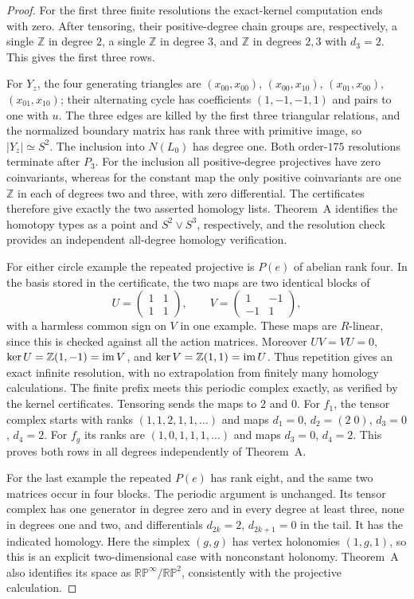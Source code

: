 \begin{proof}
For the first three finite resolutions the exact-kernel computation ends with
zero.  After tensoring, their positive-degree chain groups are,
respectively, a single $\mathbb Z$ in degree $2$, a single
$\mathbb Z$ in degree $3$, and $\mathbb Z$ in degrees $2,3$ with
$d_3=2$.  This gives the first three rows.

For $Y_z$, the four generating triangles are
$(x_{00},x_{00})$, $(x_{00},x_{10})$,
$(x_{01},x_{00})$, $(x_{01},x_{10})$; their alternating cycle
has coefficients $(1,-1,-1,1)$ and pairs to one with $u$.
The three edges are killed by the first three triangular relations,
and the normalized boundary matrix has rank three with primitive
image, so $|Y_z|\simeq S^2$.  The inclusion into $N(L_0)$ has
degree one.  Both order-$175$ resolutions terminate after $P_3$.
For the inclusion all positive-degree projectives have zero
coinvariants, whereas for the constant map the only positive
coinvariants are one $\mathbb Z$ in each of degrees two and three,
with zero differential.  The certificates therefore give exactly the
two asserted homology lists.  Theorem~A identifies the homotopy types
as a point and $S^2\vee S^3$, respectively, and the resolution check
provides an independent all-degree homology verification.

For either circle example the repeated projective is $P(e)$ of abelian
rank four.  In the basis stored in the certificate, the two maps are
two identical blocks of
\[
 U=\begin{pmatrix}1&1\\1&1\end{pmatrix},\qquad
 V=\begin{pmatrix}1&-1\\-1&1\end{pmatrix},
\]
with a harmless common sign on $V$ in one example.  These maps are
$R$-linear, since this is checked against all the action matrices.
Moreover $UV=VU=0$, $\ker U=\mathbb Z(1,-1)=\operatorname{im} V$, and
$\ker V=\mathbb Z(1,1)=\operatorname{im} U$.  Thus repetition gives an exact
infinite resolution, with no extrapolation from finitely many homology
calculations.  The finite prefix meets this periodic complex exactly,
as verified by the kernel certificates.  Tensoring sends the maps to
$2$ and $0$.  For $f_1$, the tensor complex starts with ranks
$(1,1,2,1,1,\ldots)$ and maps $d_1=0$, $d_2=(2\;0)$,
$d_3=0$, $d_4=2$.  For $f_g$ its ranks are
$(1,0,1,1,1,\ldots)$ and maps $d_3=0$, $d_4=2$.
This proves both rows in all degrees independently of Theorem~A.

For the last example the repeated $P(e)$ has rank eight, and the same
two matrices occur in four blocks.  The periodic argument is unchanged.
Its tensor complex has one generator in degree zero and in every
degree at least three, none in degrees one and two, and differentials
$d_{2k}=2$, $d_{2k+1}=0$ in the tail.  It has the indicated homology.
Here the simplex $(g,g)$ has vertex holonomies $(1,g,1)$, so this is
an explicit two-dimensional case with nonconstant holonomy.  Theorem~A
also identifies its space as
$\mathbb{RP}^{\infty}/\mathbb{RP}^{2}$, consistently with the
projective calculation.
\end{proof}

